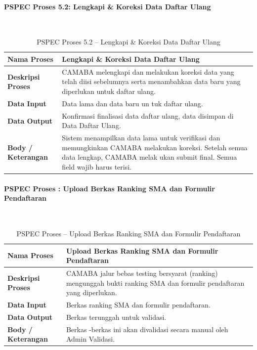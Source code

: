 \paragraph{PSPEC Proses 5.2: Lengkapi \& Koreksi Data Daftar Ulang}~\\
\begin{longtable}{|p{}|p{}|}
	\caption{PSPEC Proses 5.2 -- Lengkapi \& Koreksi Data Daftar Ulang}
	\label{table:3.pspec52}\\
	\hline
	\textbf{Nama Proses} & Lengkapi \& Koreksi Data Daftar Ulang \\
	\hline
	\textbf{Deskripsi Proses} & CAMABA melengkapi dan melakukan koreksi data yang telah diisi sebelumnya serta menambahkan data baru yang diperlukan untuk daftar ulang. \\
	\hline
	\textbf{Data Input} & Data lama dan data baru un tuk daftar ulang. \\
	\hline
	\textbf{Data Output} & Konfirmasi finalisasi data daftar ulang, data disimpan di Data Daftar Ulang. \\
	\hline
	\textbf{Body / Keterangan} & Sistem menampilkan data lama untuk verifikasi dan memungkinkan CAMABA melakukan koreksi. Setelah semua data lengkap, CAMABA melak ukan submit final. Semua field wajib harus terisi. \\
	\hline
\end{longtable}


\paragraph{PSPEC Proses : Upload Berkas Ranking SMA dan Formulir Pendaftaran}~\\
\begin{longtable}{|p{}|p{}|}
	\caption{PSPEC Proses  -- Upload Berkas Ranking SMA dan Formulir Pendaftaran}
	\label{table:3.pspec}\\
	\hline
	\textbf{Nama Proses} & Upload Berkas Ranking SMA dan Formulir Pendaftaran \\
	\hline
	\textbf{Deskripsi Proses} & CAMABA jalur bebas testing bersyarat (ranking) mengunggah bukti ranking SMA dan formulir pendaftaran yang diperlukan. \\
	\hline
	\textbf{Data Input} & Berkas ranking SMA dan formulir pendaftaran. \\
	\hline
	\textbf{Data Output} & Berkas terunggah untuk validasi. \\
	\hline
	\textbf{Body / Keterangan} & Berkas -berkas ini akan divalidasi secara manual oleh Admin Validasi. \\
	\hline
\end{longtable}


